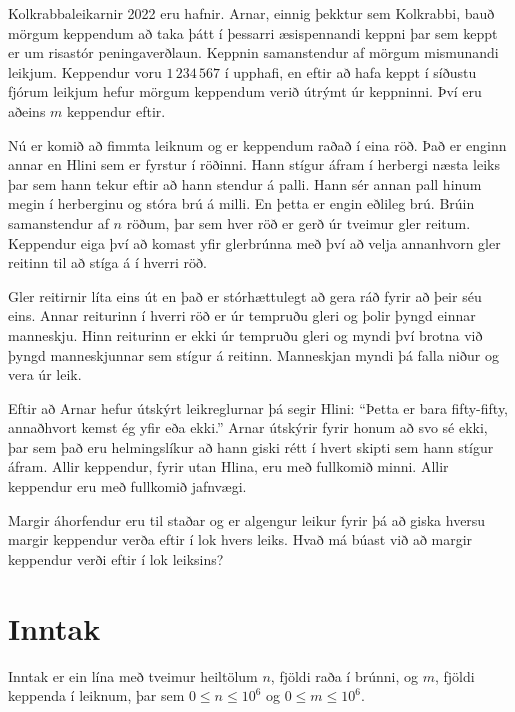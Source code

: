 
Kolkrabbaleikarnir 2022 eru hafnir. Arnar, einnig þekktur sem Kolkrabbi,
bauð mörgum keppendum að taka þátt í þessarri æsispennandi keppni þar sem
keppt er um risastór peningaverðlaun.
Keppnin samanstendur af mörgum mismunandi leikjum.
Keppendur voru $1\,234\,567$ í upphafi, en eftir að hafa keppt í síðustu fjórum 
leikjum hefur mörgum keppendum verið útrýmt úr keppninni.
Því eru aðeins $m$ keppendur eftir.

Nú er komið að fimmta leiknum og er keppendum raðað í eina röð. Það er enginn annar
en Hlini sem er fyrstur í röðinni. Hann stígur áfram í herbergi næsta leiks
þar sem hann tekur eftir að hann stendur á palli. Hann sér annan pall hinum megin í
herberginu og stóra brú á milli. En þetta er engin eðlileg brú. Brúin samanstendur
af $n$ röðum, þar sem hver röð er gerð úr tveimur gler reitum. Keppendur eiga því að
komast yfir glerbrúnna með því að velja annanhvorn gler reitinn til að stíga á í
hverri röð.

Gler reitirnir líta eins út en það er stórhættulegt að gera ráð fyrir að þeir séu
eins. Annar reiturinn í hverri röð er úr tempruðu gleri og þolir þyngd einnar 
manneskju. Hinn reiturinn er ekki úr tempruðu gleri og myndi því brotna við þyngd
manneskjunnar sem stígur á reitinn. Manneskjan myndi þá falla niður og vera úr leik.

Eftir að Arnar hefur útskýrt leikreglurnar þá segir Hlini: ``Þetta er bara fifty-fifty,
annaðhvort kemst ég yfir eða ekki.'' Arnar útskýrir fyrir honum að svo sé ekki, þar sem
það eru helmingslíkur að hann giski rétt í hvert skipti sem hann stígur áfram.
Allir keppendur, fyrir utan Hlina, eru með fullkomið minni. Allir keppendur eru með
fullkomið jafnvægi.

Margir áhorfendur eru til staðar og er algengur leikur fyrir þá að giska hversu margir
keppendur verða eftir í lok hvers leiks. Hvað má búast við að margir keppendur verði
eftir í lok leiksins?

\section*{Inntak}
Inntak er ein lína með tveimur heiltölum $n$, fjöldi raða í brúnni, og $m$, fjöldi keppenda
í leiknum, þar sem $0 \leq n \leq 10^6$ og $0 \leq m \leq 10^6$.

